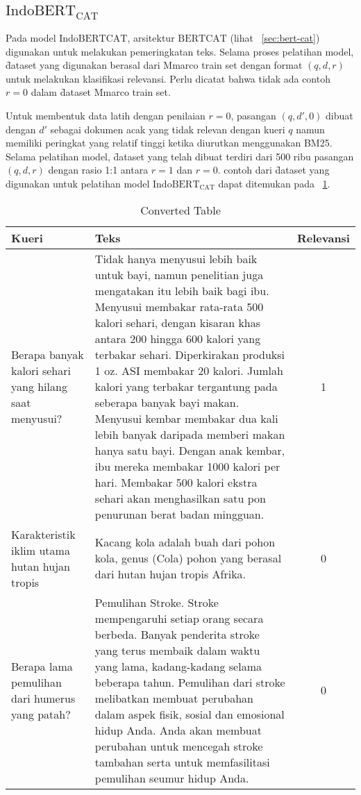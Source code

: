 \subsection{$\text{IndoBERT}_{\text{CAT}}$}


Pada model $\text{IndoBERT}{\text{CAT}}$, arsitektur $\text{BERT}\text{CAT}$ (lihat \sect~\ref{sec:bert-cat}) digunakan untuk melakukan pemeringkatan teks. Selama proses pelatihan model, \f{dataset} yang digunakan berasal dari Mmarco train set dengan format $(q, d, r)$ untuk melakukan klasifikasi relevansi. Perlu dicatat bahwa tidak ada contoh $r=0$ dalam \f{dataset} Mmarco train set.

Untuk membentuk data latih dengan penilaian $r=0$, pasangan $(q, d',0)$ dibuat dengan $d'$ sebagai dokumen acak yang tidak relevan dengan kueri $q$  namun memiliki peringkat yang relatif tinggi ketika diurutkan menggunakan BM25. Selama pelatihan model, \f{dataset} yang telah dibuat terdiri dari 500 ribu pasangan $(q, d, r)$ dengan rasio 1:1 antara $r=1$ dan $r=0$. contoh dari \f{dataset} yang digunakan untuk pelatihan model $\text{IndoBERT}_{\text{CAT}}$ dapat ditemukan pada \tab~\ref{tab:converted-table}.


\begin{table}[!ht]
    \centering
    \caption{Converted Table}
    \label{tab:converted-table}
    \begin{tabular}{|p{2cm}|p{7cm}|c|} \hline 
        \textbf{Kueri} & \textbf{Teks} & \textbf{Relevansi} \\ \hline 
        Berapa banyak kalori sehari yang hilang saat menyusui? & Tidak hanya menyusui lebih baik untuk bayi, namun penelitian juga mengatakan itu lebih baik bagi ibu. Menyusui membakar rata-rata 500 kalori sehari, dengan kisaran khas antara 200 hingga 600 kalori yang terbakar sehari. Diperkirakan produksi 1 oz. ASI membakar 20 kalori. Jumlah kalori yang terbakar tergantung pada seberapa banyak bayi makan. Menyusui kembar membakar dua kali lebih banyak daripada memberi makan hanya satu bayi. Dengan anak kembar, ibu mereka membakar 1000 kalori per hari. Membakar 500 kalori ekstra sehari akan menghasilkan satu pon penurunan berat badan mingguan. & 1 \\ \hline
        Karakteristik iklim utama hutan hujan tropis & Kacang kola adalah buah dari pohon kola, genus (Cola) pohon yang berasal dari hutan hujan tropis Afrika. & 0 \\ \hline
        Berapa lama pemulihan dari humerus yang patah? & Pemulihan Stroke. Stroke mempengaruhi setiap orang secara berbeda. Banyak penderita stroke yang terus membaik dalam waktu yang lama, kadang-kadang selama beberapa tahun. Pemulihan dari stroke melibatkan membuat perubahan dalam aspek fisik, sosial dan emosional hidup Anda. Anda akan membuat perubahan untuk mencegah stroke tambahan serta untuk memfasilitasi pemulihan seumur hidup Anda. & 0 \\ \hline
    \end{tabular}
\end{table}

